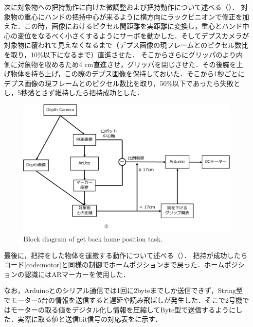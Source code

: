 次に対象物への把持動作に向けた微調整および把持動作について述べる（）．
対象物の重心にハンドの把持中心が来るように横方向にラックピニオンで修正を加えた．この時，画像におけるピクセル間距離を実距離に変換し，重心とハンド中心の変位をなるべく小さくするようにサーボを動かした．そしてデプスカメラが対象物に覆われて見えなくなるまで（デプス画像の現フレームとのピクセル数比を取り，10\%以下になるまで）直進させた．
そこからさらにグリッパのより内側に対象物を収めるため4 cm直進させ，グリッパを閉じさせた．その後腕を上げ物体を持ち上げ，この際のデプス画像を保持しておいた．そこから1秒ごとにデプス画像の現フレームとのピクセル数比を取り，50\%以下であったら失敗とし，5秒落とさず維持したら把持成功とした．

\begin{figure}
    \centering
    \includegraphics[width=0.7\linewidth]{figure/chapter4/2号機制御図_AR}
    \caption{Block diagram of get back home position task.}
    \label{fig:2号機AR}
\end{figure}

最後に，把持をした物体を運搬する動作について述べる（）．
把持が成功したらコード\ref{code:motor}と同様の制御でホームポジションまで戻った．ホームポジションの認識にはARマーカーを使用した．

なお，Arduinoとのシリアル通信では1回に2byteまでしか送信できず，String型でモーター5台の情報を送信すると遅延や読み飛ばしが発生した．そこで2号機ではモーターの取る値をデジタル化し情報を圧縮してByte型で送信するようにした．実際に取る値と送信bit信号の対応表をに示す．

